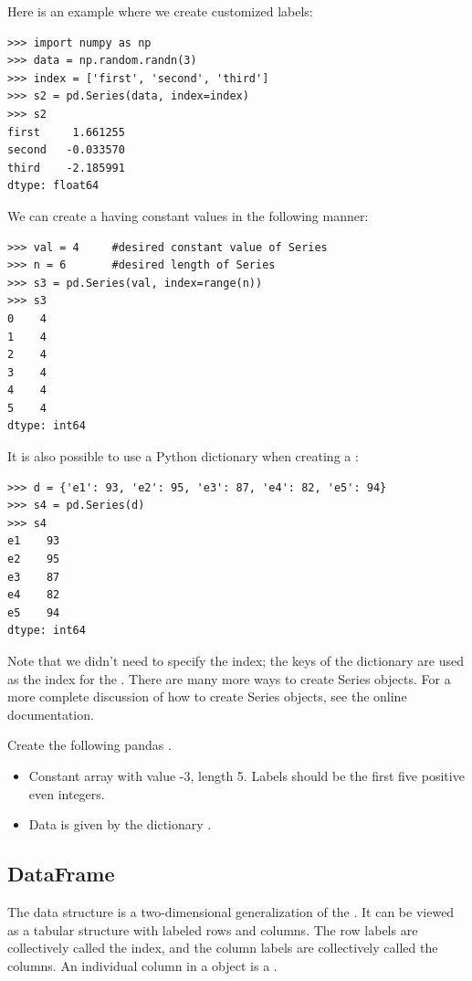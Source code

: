 Here is an example where we create customized labels:
\begin{lstlisting}
>>> import numpy as np
>>> data = np.random.randn(3)
>>> index = ['first', 'second', 'third']
>>> s2 = pd.Series(data, index=index)
>>> s2
first     1.661255
second   -0.033570
third    -2.185991
dtype: float64
\end{lstlisting}

We can create a  having constant values in the following manner:
\begin{lstlisting}
>>> val = 4     #desired constant value of Series
>>> n = 6       #desired length of Series
>>> s3 = pd.Series(val, index=range(n))
>>> s3
0    4
1    4
2    4
3    4
4    4
5    4
dtype: int64
\end{lstlisting}

It is also possible to use a Python dictionary when creating a :
\begin{lstlisting}
>>> d = {'e1': 93, 'e2': 95, 'e3': 87, 'e4': 82, 'e5': 94}
>>> s4 = pd.Series(d)
>>> s4
e1    93
e2    95
e3    87
e4    82
e5    94
dtype: int64
\end{lstlisting}
Note that we didn't need to specify the index; the keys of the dictionary are used as the index for the .
There are many more ways to create Series objects.
For a more complete discussion of how to create Series objects, see the online documentation.

\begin{problem}
Create the following pandas .

\begin{itemize}
\item Constant array with value -3, length 5. Labels should be the first five positive even integers.

\item Data is given by the dictionary .
\end{itemize}
\end{problem}

\subsection*{DataFrame}
The  data structure is a two-dimensional generalization of the . It can be viewed
as a tabular structure with labeled rows and columns. The row labels are collectively called the
index, and the column labels are collectively called the columns. An individual column in a
 object is a .

